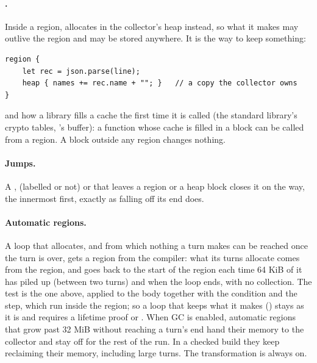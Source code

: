 \paragraph{.} Inside a region, 
allocates in the collector's heap instead, so what it makes may outlive the
region and may be stored anywhere. It is the way to keep something:

\begin{verbatim}
region {
    let rec = json.parse(line);
    heap { names += rec.name + ""; }   // a copy the collector owns
}
\end{verbatim}

\noindent and how a library fills a cache the first time it is called (the
standard library's crypto tables, 's buffer): a function whose
cache is filled in a  block can be called from a region. A
 block outside any region changes nothing.

\paragraph{Jumps.} A ,  (labelled or not) or
 that leaves a region or a heap block closes it on the way, the
innermost first, exactly as falling off its end does.

\paragraph{Automatic regions.} A loop that allocates, and from which
nothing a turn makes can be reached once the turn is over, gets a region from
the compiler: what its turns allocate comes from the region, and goes back to
the start of the region each time 64 KiB of it has piled up (between two
turns) and when the loop ends, with no collection. The test is the one above,
applied to the body together with the condition and the step, which run inside
the region; so a loop that keeps what it makes () stays as it
is and requires a lifetime proof or . When GC is enabled,
automatic regions that grow past 32 MiB without reaching a turn's end hand
their memory to the collector and stay off for the rest of the run. In a
checked build they keep reclaiming their memory, including large turns.
The transformation is always on.

